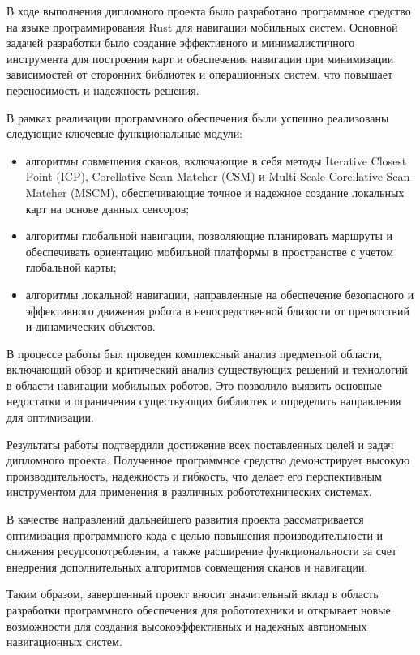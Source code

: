 \label{sec:ending}

В ходе выполнения дипломного проекта было разработано программное средство на
языке программирования Rust для навигации мобильных систем. Основной задачей
разработки было создание эффективного и минималистичного инструмента для
построения карт и обеспечения навигации при минимизации зависимостей от
сторонних библиотек и операционных систем, что повышает переносимость и
надежность решения.

В рамках реализации программного обеспечения были успешно реализованы следующие
ключевые функциональные модули:

\begin{itemize}
	\item алгоритмы совмещения сканов, включающие в себя методы Iterative
		Closest Point (ICP), Corellative Scan Matcher (CSM) и Multi-Scale
		Corellative Scan Matcher (MSCM), обеспечивающие точное и надежное
		создание локальных карт на основе данных сенсоров;
	\item алгоритмы глобальной навигации, позволяющие планировать маршруты и
		обеспечивать ориентацию мобильной платформы в пространстве с учетом
		глобальной карты;
	\item алгоритмы локальной навигации, направленные на обеспечение
		безопасного и эффективного движения робота в непосредственной близости
		от препятствий и динамических объектов.
\end{itemize}


В процессе работы был проведен комплексный анализ предметной области,
включающий обзор и критический анализ существующих решений и технологий в
области навигации мобильных роботов. Это позволило выявить
основные недостатки и ограничения существующих библиотек и определить
направления для оптимизации.

Результаты работы подтвердили достижение всех поставленных целей и задач
дипломного проекта. Полученное программное средство демонстрирует высокую
производительность, надежность и гибкость, что делает его перспективным
инструментом для применения в различных робототехнических системах.

В качестве направлений дальнейшего развития проекта рассматривается оптимизация
программного кода с целью повышения производительности и снижения
ресурсопотребления, а также расширение функциональности за счет внедрения
дополнительных алгоритмов совмещения сканов и навигации.

Таким образом, завершенный проект вносит значительный вклад в область
разработки программного обеспечения для робототехники и открывает новые
возможности для создания высокоэффективных и надежных автономных навигационных
систем.

